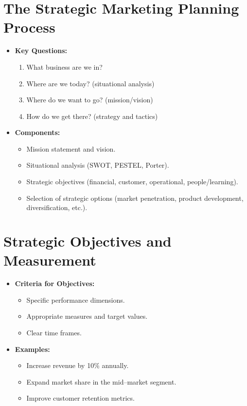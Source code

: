 \documentclass[12pt,a4paper]{report}
\begin{document}
\section{The Strategic Marketing Planning Process}
\begin{itemize}
    \item \textbf{Key Questions:}
    \begin{enumerate}[label=\arabic*.]
         \item What business are we in?
         \item Where are we today? (situational analysis)
         \item Where do we want to go? (mission/vision)
         \item How do we get there? (strategy and tactics)
    \end{enumerate}
    \item \textbf{Components:}
    \begin{itemize}
         \item Mission statement and vision.
         \item Situational analysis (SWOT, PESTEL, Porter).
         \item Strategic objectives (financial, customer, operational, people/learning).
         \item Selection of strategic options (market penetration, product development, diversification, etc.).
    \end{itemize}
\end{itemize}

\section{Strategic Objectives and Measurement}
\begin{itemize}
    \item \textbf{Criteria for Objectives:}
    \begin{itemize}
         \item Specific performance dimensions.
         \item Appropriate measures and target values.
         \item Clear time frames.
    \end{itemize}
    \item \textbf{Examples:}
    \begin{itemize}
         \item Increase revenue by 10\% annually.
         \item Expand market share in the mid--market segment.
         \item Improve customer retention metrics.
    \end{itemize}
\end{itemize}
\end{document}
